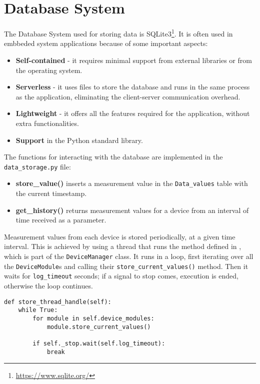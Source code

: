 \section{Database System}

The Database System used for storing data is SQLite3\footnote{\url{https://www.sqlite.org/}}. It is often used in embbeded system applications because of some important aspects:
\begin{itemize}
\item \textbf{Self-contained} - it requires minimal support from external libraries or from the operating system.
\item \textbf{Serverless} - it uses files to store the database and runs in the same process as the application, eliminating the client-server communication overhead.
\item \textbf{Lightweight} - it offers all the features required for the application, without extra functionalities.
\item \textbf{Support} in the Python standard library.
\end{itemize}

The functions for interacting with the database are implemented in the \texttt{data_storage.py} file:

\begin{itemize}
\item \textbf{store_value()} inserts a measurement value in the \texttt{Data_values} table with the current timestamp.
\item \textbf{get_history()} returns measurement values for a device from an interval of time received as a parameter.
\end{itemize}

Measurement values from each device is stored periodically, at a given time interval. This is achieved by using a thread that runs the method defined in , which is part of the \texttt{DeviceManager} class. It runs in a loop, first iterating over all the \texttt{DeviceModule}s and calling their \texttt{store_current_values()} method. Then it waits for \texttt{log_timeout} seconds; if a signal to stop comes, execution is ended, otherwise the loop continues.

\lstset{language=Python, showstringspaces=false, caption=Data Storage thread method, label=lst:store-thread}
\begin{lstlisting}
def store_thread_handle(self):
    while True:
        for module in self.device_modules:
            module.store_current_values()

        if self._stop.wait(self.log_timeout):
            break
\end{lstlisting}

